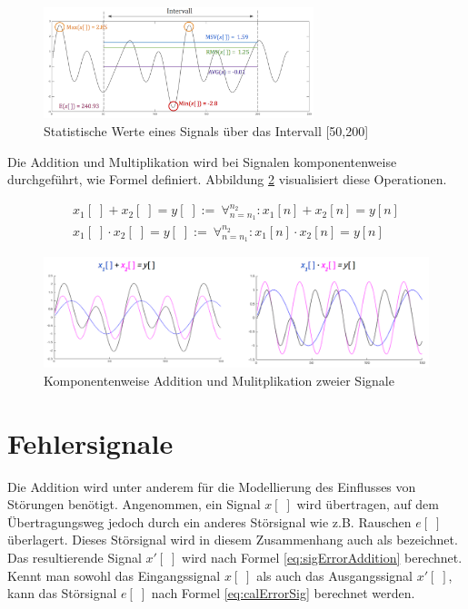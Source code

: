 \begin{figure}[h]
	\centering
	\includegraphics[width=0.7\textwidth]{bilder/sigStats02.png}
	\caption{Statistische Werte eines Signals über das Intervall [50,200]}
	\label{img:sigStats}
\end{figure}

Die Addition und Multiplikation wird bei Signalen komponentenweise durchgeführt, wie Formel \label{eq:addAndMult} definiert.  Abbildung \ref{img:addAndMultSig} visualisiert diese Operationen. 

\begin{equation}
\begin{gathered} 
x_1[\;] + x_2[\;] = y[\;] :=\ \mathop{\forall}_{n = n_1}^{n_2}  :  x_1[n] + x_2[n] = y[n] \\
x_1[\;] \cdot x_2[\;] = y[\;] :=\ \mathop{\forall}_{n = n_1}^{n_2}  :  x_1[n] \cdot x_2[n] = y[n]
\end{gathered}
\label{eq:addAndMult}
\end{equation}

\begin{figure}[h]
	\centering
	\includegraphics[width=1\textwidth]{bilder/addAndMultSig02.png}
	\caption{Komponentenweise Addition und Mulitplikation zweier Signale}
	\label{img:addAndMultSig}
\end{figure}

\section{Fehlersignale}

Die Addition wird unter anderem für die Modellierung des Einflusses von Störungen benötigt. Angenommen, ein Signal $x[\;]$ wird übertragen, auf dem Übertragungsweg jedoch durch ein anderes Störsignal wie z.B. Rauschen $e[\;]$ überlagert. Dieses Störsignal wird in diesem Zusammenhang auch als  bezeichnet. Das resultierende Signal $x'[\;]$ wird nach Formel \ref{eq:sigErrorAddition} berechnet. Kennt man sowohl das Eingangssignal $x[\;]$ als auch das Ausgangssignal $x'[\;]$, kann das Störsignal $e[\;]$ nach Formel \ref{eq:calErrorSig} berechnet werden.


